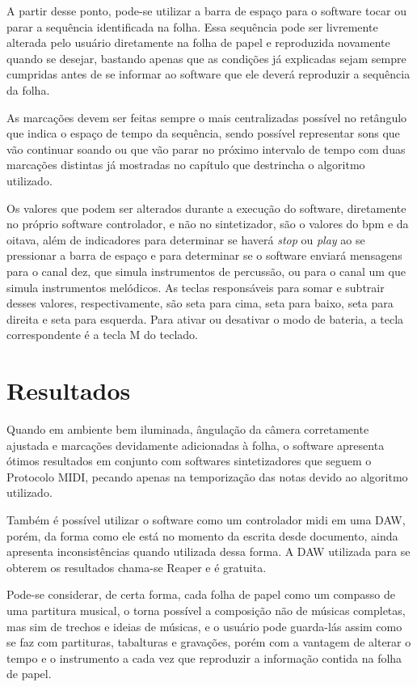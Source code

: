 \documentclass[12pt]{report}
\begin{document}
A partir desse ponto, pode-se utilizar a barra de espaço para o software tocar ou parar a sequência identificada na folha. Essa sequência pode ser livremente alterada pelo usuário diretamente na folha de papel e reproduzida novamente quando se desejar, bastando apenas que as condições já explicadas sejam sempre cumpridas antes de se informar ao software que ele deverá reproduzir a sequência da folha.

As marcações devem ser feitas sempre o mais centralizadas possível no retângulo que indica o espaço de tempo da sequência, sendo possível representar sons que vão continuar soando ou que vão parar no próximo intervalo de tempo com duas marcações distintas já mostradas no capítulo que destrincha o algoritmo utilizado.

Os valores que podem ser alterados durante a execução do software, diretamente no próprio software controlador, e não no sintetizador, são o valores do bpm e da oitava, além de indicadores para determinar se haverá {\it stop} ou {\it play} ao se pressionar a barra de espaço e para determinar se o software enviará mensagens para o canal dez, que simula instrumentos de percussão, ou para o canal um que simula instrumentos melódicos. As teclas responsáveis para somar e subtrair desses valores, respectivamente, são seta para cima, seta para baixo, seta para direita e seta para esquerda. Para ativar ou desativar o modo de bateria, a tecla correspondente é a tecla M do teclado.


\chapter{Resultados}
\label{cha:resultados}

Quando em ambiente bem iluminada, ângulação da câmera corretamente ajustada e marcações devidamente adicionadas à folha, o software apresenta ótimos resultados em conjunto com softwares sintetizadores que seguem o Protocolo MIDI, pecando apenas na temporização das notas devido ao algoritmo utilizado.

Também é possível utilizar o software como um controlador midi em uma DAW, porém, da forma como ele está no momento da escrita desde documento, ainda apresenta inconsistências quando utilizada dessa forma. A DAW utilizada para se obterem os resultados chama-se Reaper e é gratuita.

Pode-se considerar, de certa forma, cada folha de papel como um compasso de uma partitura musical, o torna possível a composição não de músicas completas, mas sim de trechos e ideias de músicas, e o usuário pode guarda-lás assim como se faz com partituras, tabalturas e gravações, porém com a vantagem de alterar o tempo e o instrumento a cada vez que reproduzir a informação contida na folha de papel.
\end{document}
